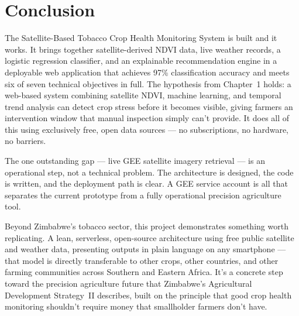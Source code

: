 \section{Conclusion}

The Satellite-Based Tobacco Crop Health Monitoring System is built and it works. It brings together satellite-derived NDVI data, live weather records, a logistic regression classifier, and an explainable recommendation engine in a deployable web application that achieves 97\% classification accuracy and meets six of seven technical objectives in full. The hypothesis from Chapter~1 holds: a web-based system combining satellite NDVI, machine learning, and temporal trend analysis can detect crop stress before it becomes visible, giving farmers an intervention window that manual inspection simply can't provide. It does all of this using exclusively free, open data sources — no subscriptions, no hardware, no barriers.

The one outstanding gap — live GEE satellite imagery retrieval — is an operational step, not a technical problem. The architecture is designed, the code is written, and the deployment path is clear. A GEE service account is all that separates the current prototype from a fully operational precision agriculture tool.

Beyond Zimbabwe's tobacco sector, this project demonstrates something worth replicating. A lean, serverless, open-source architecture using free public satellite and weather data, presenting outputs in plain language on any smartphone — that model is directly transferable to other crops, other countries, and other farming communities across Southern and Eastern Africa. It's a concrete step toward the precision agriculture future that Zimbabwe's Agricultural Development Strategy~II \citep{moa2022} describes, built on the principle that good crop health monitoring shouldn't require money that smallholder farmers don't have.

